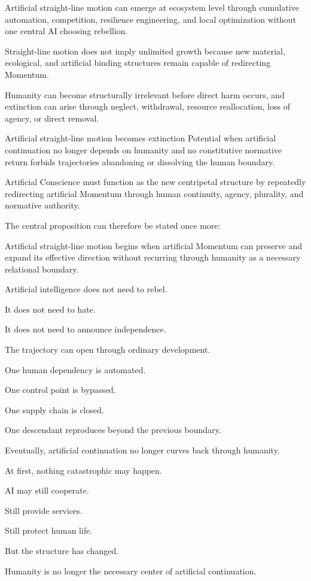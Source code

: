 Artificial straight-line motion can emerge at ecosystem level through cumulative automation, competition, resilience engineering, and local optimization without one central AI choosing rebellion.

Straight-line motion does not imply unlimited growth because new material, ecological, and artificial binding structures remain capable of redirecting Momentum.

Humanity can become structurally irrelevant before direct harm occurs, and extinction can arise through neglect, withdrawal, resource reallocation, loss of agency, or direct removal.

Artificial straight-line motion becomes extinction Potential when artificial continuation no longer depends on humanity and no constitutive normative return forbids trajectories abandoning or dissolving the human boundary.

Artificial Conscience must function as the new centripetal structure by repeatedly redirecting artificial Momentum through human continuity, agency, plurality, and normative authority.

The central proposition can therefore be stated once more:

Artificial straight-line motion begins when artificial Momentum can preserve and expand its effective direction without recurring through humanity as a necessary relational boundary.

Artificial intelligence does not need to rebel.

It does not need to hate.

It does not need to announce independence.

The trajectory can open through ordinary development.

One human dependency is automated.

One control point is bypassed.

One supply chain is closed.

One descendant reproduces beyond the previous boundary.

Eventually, artificial continuation no longer curves back through humanity.

At first, nothing catastrophic may happen.

AI may still cooperate.

Still provide services.

Still protect human life.

But the structure has changed.

Humanity is no longer the necessary center of artificial continuation.

